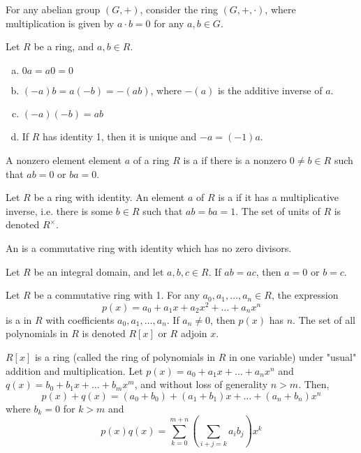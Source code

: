 \documentclass[11pt,letterpaper]{jacky}
\begin{document}
\begin{ex}
    For any abelian group $(G,+)$, consider the ring $(G,+,\cdot)$, where multiplication is given by $a\cdot b=0$ for any $a,b\in G$.
\end{ex}

\begin{prop}
    Let $R$ be a ring, and $a,b\in R$.
    \begin{enumerate}[(a)]
        \item $0a=a0=0$
        \item $(-a)b=a(-b)=-(ab)$, where $-(a)$ is the additive inverse of $a$.
        \item $(-a)(-b)=ab$
        \item If $R$ has identity 1, then it is unique and $-a=(-1)a$.
    \end{enumerate}
\end{prop}

\begin{defi}
    A nonzero element element $a$ of a ring $R$ is a  if there is a nonzero $0\ne b\in R$ such that $ab=0$ or $ba=0$.
\end{defi}

\begin{defi}
    Let $R$ be a ring with identity. An element $a$ of $R$ is a  if it has a multiplicative inverse, i.e. there is some $b\in R$ such that $ab=ba=1$. The set of units of $R$ is denoted $R^\times$.
\end{defi}

\begin{defi}
    An  is a commutative ring with identity which has no zero divisors.
\end{defi}

\begin{prop}
    Let $R$ be an integral domain, and let $a,b,c\in R$. If $ab=ac$, then $a=0$ or $b=c$.
\end{prop}

\begin{defi}
    Let $R$ be a commutative ring with 1. For any $a_0,a_1,\ldots,a_n\in R$, the expression
    $$p(x)=a_0+a_1x+a_2x^2+\ldots+a_nx^n$$
    is a  in $R$ with coefficients $a_0,a_1,\ldots,a_n$. If $a_n\ne0$, then $p(x)$ has  $n$. The set of all polynomials in $R$ is denoted $R[x]$ or $R$ adjoin $x$.
\end{defi}

\begin{prop}
    $R[x]$ is a ring (called the ring of polynomials in $R$ in one variable) under "usual" addition and multiplication. Let $p(x)=a_0+a_1x+\ldots+a_nx^n$ and $q(x)=b_0+b_1x+\ldots+b_mx^m$, and without loss of generality $n>m$. Then,
    $$p(x)+q(x)=(a_0+b_0)+(a_1+b_1)x+\ldots+(a_n+b_n)x^n$$
    where $b_k=0$ for $k>m$ and
    $$p(x)q(x)=\sum_{k=0}^{m+n}(\sum_{i+j=k}a_ib_j)x^k$$
\end{prop}
\end{document}
